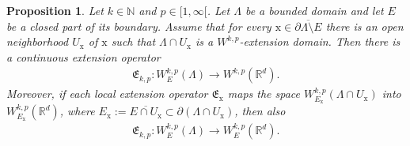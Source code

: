\documentclass[10pt,leqno]{amsart}
\newtheorem{proposition}[theorem]{Proposition}
\theoremstyle{definition}
\numberwithin{equation}{section}
\begin{document}
\begin{proposition} \label{p-extension}
Let $k \in {{\mathbb N}}$ and $p \in [1,\infty[$. Let $\Lambda$ be a bounded domain and
let $E$ be a closed part of its boundary. Assume that for every ${{\mathrm x}} \in
\overline{\partial \Lambda \setminus E}$ there is an open neighborhood $U_{{\mathrm x}}$ of
$ {{\mathrm x}}$ such that $\Lambda \cap U_{{\mathrm x}}$ is a $W^{k,p}$-extension domain. Then
there is a continuous extension operator
 \begin{align*}
  \mathfrak{E}_{k,p}: W^{k,p}_E(\Lambda) \to W^{k,p}({{\mathbb R}}^d).
 \end{align*}
 Moreover, if each local extension operator $\mathfrak{E}_{{\mathrm x}}$ maps the space
 $W_{E_{{\mathrm x}}}^{k,p}(\Lambda \cap U_{{\mathrm x}})$ into $W_{E_{{\mathrm x}}}^{k,p}({{\mathbb R}}^d)$, where $E_{{\mathrm x}} :=
 \overline{E \cap U_{{\mathrm x}}} \subset \partial(\Lambda \cap U_{{\mathrm x}})$, then also
 \begin{align*}
  \mathfrak{E}_{k,p}: W^{k,p}_E(\Lambda) \to W^{k,p}_E({{\mathbb R}}^d).
 \end{align*}
\end{proposition}
\end{document}
